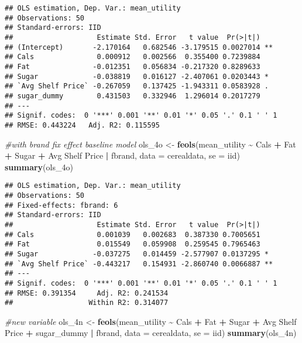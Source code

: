 \documentclass[
]{article}
\newenvironment{Shaded}{\begin{snugshade}}{\end{snugshade}}
\newcommand{\AttributeTok}[1]{\textcolor[rgb]{0.13,0.29,0.53}{#1}}
\newcommand{\CommentTok}[1]{\textcolor[rgb]{0.56,0.35,0.01}{\textit{#1}}}
\newcommand{\FunctionTok}[1]{\textcolor[rgb]{0.13,0.29,0.53}{\textbf{#1}}}
\newcommand{\NormalTok}[1]{#1}
\newcommand{\OtherTok}[1]{\textcolor[rgb]{0.56,0.35,0.01}{#1}}
\newcommand{\SpecialCharTok}[1]{\textcolor[rgb]{0.81,0.36,0.00}{\textbf{#1}}}
\newcommand{\StringTok}[1]{\textcolor[rgb]{0.31,0.60,0.02}{#1}}
\begin{document}
\begin{verbatim}
## OLS estimation, Dep. Var.: mean_utility
## Observations: 50
## Standard-errors: IID 
##                    Estimate Std. Error   t value  Pr(>|t|)    
## (Intercept)       -2.170164   0.682546 -3.179515 0.0027014 ** 
## Cals               0.000912   0.002566  0.355400 0.7239884    
## Fat               -0.012351   0.056834 -0.217320 0.8289633    
## Sugar             -0.038819   0.016127 -2.407061 0.0203443 *  
## `Avg Shelf Price` -0.267059   0.137425 -1.943311 0.0583928 .  
## sugar_dummy        0.431503   0.332946  1.296014 0.2017279    
## ---
## Signif. codes:  0 '***' 0.001 '**' 0.01 '*' 0.05 '.' 0.1 ' ' 1
## RMSE: 0.443224   Adj. R2: 0.115595
\end{verbatim}

\begin{Shaded}
\begin{Highlighting}[]
\CommentTok{\#with brand fix effect baseline model}
\NormalTok{ols\_4o }\OtherTok{\textless{}{-}} \FunctionTok{feols}\NormalTok{(mean\_utility }\SpecialCharTok{\textasciitilde{}}\NormalTok{ Cals }\SpecialCharTok{+}\NormalTok{ Fat }\SpecialCharTok{+}\NormalTok{ Sugar }\SpecialCharTok{+} \StringTok{\textasciigrave{}}\AttributeTok{Avg Shelf Price}\StringTok{\textasciigrave{}} \SpecialCharTok{|}\NormalTok{ fbrand, }\AttributeTok{data =}\NormalTok{ cerealdata,}
                \AttributeTok{se =} \StringTok{\textquotesingle{}iid\textquotesingle{}}\NormalTok{)}
\FunctionTok{summary}\NormalTok{(ols\_4o)}
\end{Highlighting}
\end{Shaded}

\begin{verbatim}
## OLS estimation, Dep. Var.: mean_utility
## Observations: 50
## Fixed-effects: fbrand: 6
## Standard-errors: IID 
##                    Estimate Std. Error   t value  Pr(>|t|)    
## Cals               0.001039   0.002683  0.387330 0.7005651    
## Fat                0.015549   0.059908  0.259545 0.7965463    
## Sugar             -0.037275   0.014459 -2.577907 0.0137295 *  
## `Avg Shelf Price` -0.443217   0.154931 -2.860740 0.0066887 ** 
## ---
## Signif. codes:  0 '***' 0.001 '**' 0.01 '*' 0.05 '.' 0.1 ' ' 1
## RMSE: 0.391354     Adj. R2: 0.241534
##                  Within R2: 0.314077
\end{verbatim}

\begin{Shaded}
\begin{Highlighting}[]
\CommentTok{\#new variable}
\NormalTok{ols\_4n }\OtherTok{\textless{}{-}} \FunctionTok{feols}\NormalTok{(mean\_utility }\SpecialCharTok{\textasciitilde{}}\NormalTok{ Cals }\SpecialCharTok{+}\NormalTok{ Fat }\SpecialCharTok{+}\NormalTok{ Sugar }\SpecialCharTok{+} \StringTok{\textasciigrave{}}\AttributeTok{Avg Shelf Price}\StringTok{\textasciigrave{}} \SpecialCharTok{+}\NormalTok{ sugar\_dummy }\SpecialCharTok{|}\NormalTok{ fbrand, }\AttributeTok{data =}\NormalTok{ cerealdata,}
                \AttributeTok{se =} \StringTok{\textquotesingle{}iid\textquotesingle{}}\NormalTok{)}
\FunctionTok{summary}\NormalTok{(ols\_4n)}
\end{Highlighting}
\end{Shaded}
\end{document}

